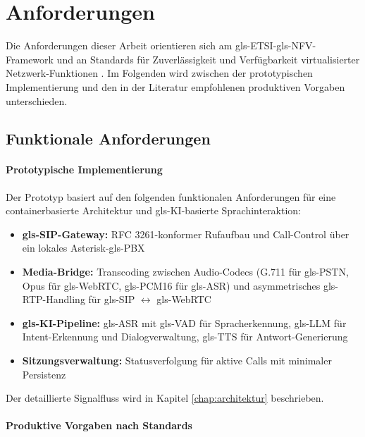 \chapter{Anforderungen}
\label{chap:anforderungen}


Die Anforderungen dieser Arbeit orientieren sich am \gls{gls-ETSI}-\gls{gls-NFV}-Framework \parencite{ETSI-NFV} und an Standards für Zuverlässigkeit und Verfügbarkeit virtualisierter Netzwerk-Funktionen \parencite{ETSI-REL}. Im Folgenden wird zwischen der prototypischen Implementierung und den in der Literatur empfohlenen produktiven Vorgaben unterschieden.

\section{Funktionale Anforderungen}

\subsubsection{Prototypische Implementierung}

Der Prototyp basiert auf den folgenden funktionalen Anforderungen für eine containerbasierte Architektur und \gls{gls-KI}-basierte Sprachinteraktion:

\begin{itemize}
  \item \textbf{\gls{gls-SIP}-Gateway:} RFC 3261-konformer Rufaufbau und Call-Control über ein lokales Asterisk-\gls{gls-PBX} \parencite{rfc3261}
  \item \textbf{Media-Bridge:} Transcoding zwischen Audio-Codecs (G.711 für \gls{gls-PSTN}, Opus für \gls{gls-WebRTC}, \gls{gls-PCM16} für \gls{gls-ASR}) und asymmetrisches \gls{gls-RTP}-Handling für \gls{gls-SIP} $\leftrightarrow$ \gls{gls-WebRTC} \parencite{rfc3550}
  \item \textbf{\gls{gls-KI}-Pipeline:} \gls{gls-ASR} mit \gls{gls-VAD} für Spracherkennung, \gls{gls-LLM} für Intent-Erkennung und Dialogverwaltung, \gls{gls-TTS} für Antwort-Generierung
  \item \textbf{Sitzungsverwaltung:} Statusverfolgung für aktive Calls mit minimaler Persistenz
\end{itemize}

Der detaillierte Signalfluss wird in Kapitel \ref{chap:architektur} beschrieben.

\subsubsection{Produktive Vorgaben nach Standards}

